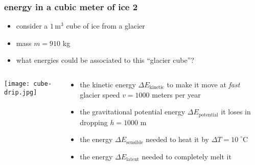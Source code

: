 \documentclass{beamer}
\begin{document}
\begin{frame}
  \frametitle{energy in a cubic meter of ice 2}

\begin{itemize}
\item consider a $1\,\text{m}^3$ cube of ice from a glacier
\item mass $m=910$ kg
\item what energies could be associated to this ``glacier cube''?
\end{itemize}

\begin{columns}
\begin{column}{0.25\textwidth}
  \begin{center}
    \texttt{[image: cube-drip.jpg]}
  \end{center}
\end{column}
\begin{column}{0.85\textwidth}

\begin{itemize}
\item the kinetic energy $\Delta E_{\text{kinetic}}$ to make it move at \emph{fast} glacier speed $v=1000$ meters per year
\item the gravitational potential energy $\Delta E_{\text{potential}}$ it loses in dropping $h=1000$ m
\item the energy $\Delta E_{\text{sensible}}$ needed to heat it by $\Delta T = 10\phantom{|}^\circ\text{C}$
\item the energy $\Delta E_{\text{latent}}$ needed to completely melt it
\end{itemize}
\end{column}
\end{columns}
\end{frame}

\begin{comment}
>> energyscales
energies in Joules:
Ekinetic =  4.5690e-07
Epotential =  8927100
Esensible =  18281900
Elatent =  303940000
\end{comment}
\end{document}

